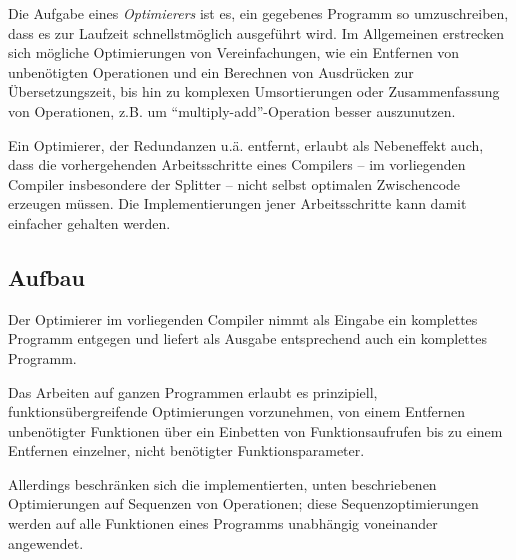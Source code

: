 \documentclass[twoside,a4paper,fleqn,12pt]{book}
\begin{document}
\newcommand\OptSampleStacked[4]{
  \begin{figure}[!h]
    \centering
    
    \caption{#2.}
    \label{fig:ir_optex_#1_in}
  \end{figure}
  \begin{figure}[!h]
    \centering
    
    \caption{#3.}
    \label{fig:ir_optex_#1_unopt}
  \end{figure}
  \begin{figure}[!h]
    \centering
    
    \caption{#4.}
    \label{fig:ir_optex_#1_opt}
  \end{figure}
}

Die Aufgabe eines \emph{Optimierers} ist es, ein gegebenes Programm so umzuschreiben, dass es zur Laufzeit
schnellstmöglich ausgeführt wird. Im Allgemeinen erstrecken sich mögliche Optimierungen von Vereinfachungen,
wie ein Entfernen von unbenötigten Operationen und ein Berechnen von Ausdrücken zur Übersetzungszeit,
bis hin zu komplexen Umsortierungen oder Zusammenfassung von Operationen, z.B. um ``multiply-add''-Operation
besser auszunutzen.

Ein Optimierer, der Redundanzen u.ä. entfernt, erlaubt als Nebeneffekt auch, dass die vorhergehenden Arbeitsschritte
eines Compilers -- im vorliegenden Compiler insbesondere der Splitter --
nicht selbst optimalen Zwischencode erzeugen müssen. Die Implementierungen jener Arbeitsschritte kann damit
einfacher gehalten werden.

\subsection{Aufbau}


Der Optimierer im vorliegenden Compiler nimmt als Eingabe ein komplettes Programm entgegen
und liefert als Ausgabe entsprechend auch ein komplettes Programm.

Das Arbeiten auf ganzen Programmen erlaubt es prinzipiell, funktionsübergreifende Optimierungen
vorzunehmen, von einem Entfernen unbenötigter Funktionen über ein Einbetten von Funktionsaufrufen bis zu einem Entfernen
einzelner, nicht benötigter Funktionsparameter.

Allerdings beschränken sich die implementierten, unten beschriebenen Optimierungen auf Sequenzen
von Operationen; diese Sequenzoptimierungen werden auf alle Funktionen eines Programms unabhängig
voneinander angewendet.
\end{document}
